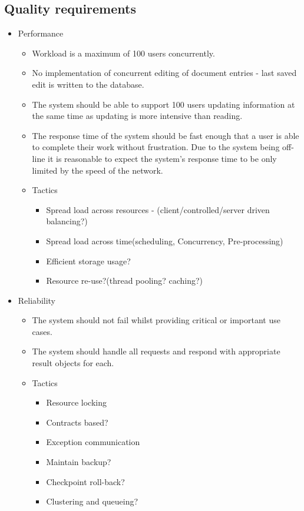 \documentclass[a4paper,12pt]{article}
\begin{document}
	\subsection{Quality requirements}\label{subsec:quality}
	\begin{itemize}
		\item Performance
		\begin{itemize}
			\item Workload is a maximum of 100 users concurrently.
			\item No implementation of concurrent editing of document entries - last saved edit is written to the database.
			\item The system should be able to support 100 users updating information at the same time as updating is more intensive than reading.
			\item The response time of the system should be fast enough that a user is able to complete their work without frustration. Due to the system being off-line it is reasonable to expect the system's response time to be only limited by the speed of the network.
			
			\item Tactics
			\begin{itemize}
					\item Spread load across resources - (client/controlled/server driven balancing?)
					\item Spread load across time(scheduling, Concurrency, Pre-processing)
					\item Efficient storage usage?
					\item Resource re-use?(thread pooling? caching?)
			\end{itemize}		
		\end{itemize}
		\item Reliability
		\begin{itemize}
			\item The system should not fail whilst providing critical or important use cases.
			\item The system should handle all requests and respond with appropriate result objects for each.
			
			\item Tactics
			\begin{itemize}
				\item Resource locking
				\item Contracts based?
				\item Exception communication
				\item Maintain backup?
				\item Checkpoint roll-back?
				\item Clustering and queueing?
			\end{itemize}
						

\end{itemize}
\end{itemize}
\end{document}
